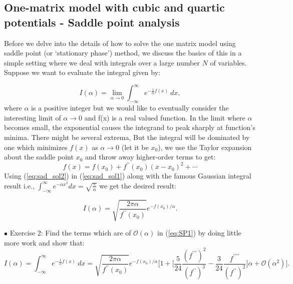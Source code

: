 \documentclass[11pt]{article}
\begin{document}
\subsection{One-matrix model with cubic and quartic potentials - Saddle point analysis}
Before we delve into the details of how to solve the one matrix model using saddle point (or `stationary phase') method, we discuss the basics of this in a simple setting where we deal with integrals over a large number $N$ of variables. Suppose we want to evaluate the integral given by:

\begin{equation}
\label{eq:SP1} 
I(\alpha) = \lim_{\alpha \to 0} \int_{-\infty}^{\infty} e^{-\frac{1}{\alpha}f(x)} ~dx, 
\end{equation}
where $\alpha$ is a positive integer but we would like to eventually consider the interesting limit 
of $\alpha \to 0$ and f(x) is a real valued function. In the limit where $\alpha$ becomes small, 
the exponential causes the integrand to peak sharply at function's minima. There might be several extrema,
But the integral will be dominated by one which minimizes $f(x)$ as $\alpha \to 0$ (let it be $x_{0}$), 
we use the Taylor expansion about the saddle point $x_{0}$ and throw away higher-order terms to get:
\begin{equation}
	\label{eq:sad_sol2}
	f(x) = f(x_{0}) + f^{\prime\prime}(x_{0}) (x-x_0)^{2} + \cdots 
\end{equation}
Using (\ref{eq:sad_sol2}) in (\ref{eq:sad_sol1}) along with the famous Gaussian integral result i.e.,  $\int_{-\infty}^{\infty} e^{-\alpha x^2} dx = \sqrt{\frac{\pi}{\alpha}}$ we get the desired result:

\begin{equation}
	\label{eq:sad_sol1} 
	I(\alpha) =  \sqrt{\frac{2\pi \alpha}{f^{\prime\prime}(x_{0})}} e^{-f(x_{0})/\alpha}. 
\end{equation}



\begin{mdframed}[backgroundcolor=blue!3] 
	\textsc{} 
	$\bullet$ Exercise 2: Find the terms which are of $\mathcal{O}(\alpha)$ in (\ref{eq:SP1}) by doing little more work and show that:
	\begin{equation*}
	I(\alpha) = \int_{-\infty}^{\infty} e^{-\frac{1}{\alpha}f(x)} ~dx = \sqrt{\frac{2\pi \alpha}{f^{\prime\prime}(x_{0})}} e^{-f(x_{0})/\alpha} \Bigg[1 + 
	\Big[ \frac{5}{24} \frac{(f^{\prime\prime\prime})^2}{(f^{\prime\prime})^3} - \frac{3}{24} \frac{f^{\prime\prime\prime\prime}}{(f^{\prime\prime})^2}\Big] \alpha + \mathcal{O}(\alpha^{2})\Bigg]. 
	\end{equation*}	
\end{mdframed} 
\end{document}
